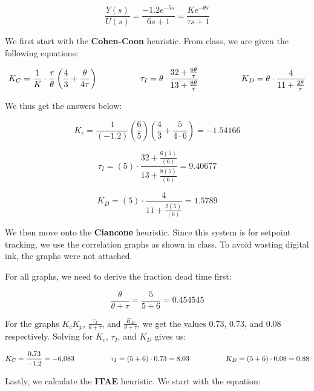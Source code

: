 \documentclass[12pt]{article}
\begin{document}
\begin{enumerate}
\begin{enumerate}
    \begin{equation}
      \frac{Y(s)}{U(s)} = \frac{-1.2e^{-5s}}{6s + 1} = \frac{Ke^{-\theta s}}{\tau s + 1}
    \end{equation}

    We first start with the \textbf{Cohen-Coon} heuristic. From class, we are given the following equations:

    $$
      K_C = \frac{1}{K} \cdot \frac{\tau}{\theta} \left( \frac{4}{3} + \frac{\theta}{4\tau} \right) \quad \quad \quad \quad \quad
      \tau_I = \theta \cdot \frac{32 + \frac{6\theta}{\tau}}{13 + \frac{8\theta}{\tau}} \quad \quad \quad \quad \quad
      K_D = \theta \cdot \frac{4}{11 + \frac{2\theta}{\tau}} \\
    $$

    We thus get the answers below:

    \[
    K_c = \frac{1}{\left(-1.2\right)} \left( \frac{6}{5} \right) \left( \frac{4}{3} + {\frac{5}{4 \cdot 6}} \right) = -1.54166
    \]

    \[
      \tau_I = \left(5\right) \cdot \frac{32 + \frac{6\left(5\right)}{\left(6\right)}}{13 + \frac{8\left(5\right)}{\left(6\right)}} = 9.40677
    \]

    \[
      K_D = \left(5\right) \cdot \frac{4}{11 + \frac{2\left(5\right)}{\left(6\right)}} = 1.5789
    \]

    We then move onto the \textbf{Ciancone} heuristic. Since this system is for setpoint tracking, we use the correlation graphs as shown in class. To avoid wasting digital ink, the graphs were not attached.

    For all graphs, we need to derive the fraction dead time first:

    \[
      \frac{\theta}{\theta + \tau} = \frac{5}{5 + 6} = 0.454545
    \]

    For the graphs \( K_c K_p \), \( \frac{\tau_I}{\theta + \tau} \), and \( \frac{K_D}{\theta + \tau} \), we get the values 0.73, 0.73, and 0.08 respectively. Solving for \( K_c \), \( \tau_I \), and \( K_D \) gives us:

    $$
      K_C = \frac{0.73}{-1.2} = -6.083 \quad \quad \quad \quad \quad
      \tau_I = \left(5 + 6\right) \cdot 0.73 = 8.03 \quad \quad \quad \quad \quad
      K_D = \left(5 + 6\right) \cdot 0.08 = 0.88 \\
    $$

    \pagebreak

    Lastly, we calculate the \textbf{ITAE} heuristic. We start with the equation:


\end{enumerate}
\end{enumerate}
\end{document}
